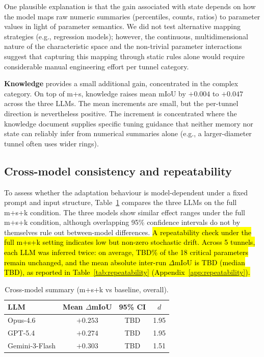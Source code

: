 \documentclass[a4paper,fleqn]{cas-dc}
\begin{document}
{One plausible explanation is that the gain associated with state depends on how the model maps raw numeric summaries (percentiles, counts, ratios) to parameter values in light of parameter semantics. We did not test alternative mapping strategies (e.g., regression models); however, the continuous, multidimensional nature of the characteristic space and the non-trivial parameter interactions suggest that capturing this mapping through static rules alone would require considerable manual engineering effort per tunnel category.

\textbf{Knowledge} provides a small additional gain, concentrated in the complex category. On top of m+s, knowledge raises mean mIoU by $+0.004$ to $+0.047$ across the three LLMs. The mean increments are small, but the per-tunnel direction is nevertheless positive. The increment is concentrated where the knowledge document supplies specific tuning guidance that neither memory nor state can reliably infer from numerical summaries alone (e.g.,  a larger-diameter tunnel often uses wider rings).


\subsection{Cross-model consistency and repeatability}\label{sec:consistency}

To assess whether the adaptation behaviour is model-dependent under a fixed prompt and input structure, Table~\ref{tab:cross-model} compares the three LLMs on the full m+s+k condition. The three models show similar effect ranges under the full m+s+k condition, although overlapping 95\% confidence intervals do not by themselves rule out between-model differences.
\hl{A repeatability check under the full \mbox{m+s+k} setting indicates low but non-zero stochastic drift. Across 5 tunnels, each LLM was inferred twice: on average, TBD\% of the 18 critical parameters remain unchanged, and the mean absolute inter-run \mbox{$\Delta$}mIoU is TBD (median TBD), as reported in Table~\ref{tab:repeatability} (Appendix~\ref{app:repeatability}).}

\begin{table}[ht]
\caption{Cross-model summary (m+s+k vs baseline, overall).}\label{tab:cross-model}
\begin{tabular*}{\tblwidth}{@{} l c c c @{}}
\toprule
LLM & Mean $\Delta$mIoU & 95\% CI & \mbox{$d$} \\
\midrule
Opus-4.6 & $+0.253$ & TBD & 1.95 \\
GPT-5.4 & $+0.274$ & TBD & 1.95 \\
Gemini-3-Flash & $+0.303$ & TBD & 1.51 \\
\bottomrule
\end{tabular*}
\end{table}

}
\end{document}
